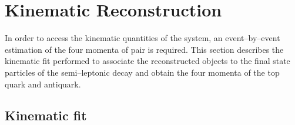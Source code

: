 \chapter{Kinematic Reconstruction}
\label{sec:reconstruction}

In order to access the kinematic quantities of the \ttbar{} system, an
event--by--event estimation of the four momenta of \ttbar{}
pair is required. This section describes the kinematic fit performed
to associate the reconstructed objects to the final state particles of
the semi--leptonic \ttbar{} decay and obtain the four momenta of the
top quark and antiquark.

\section{Kinematic fit}

